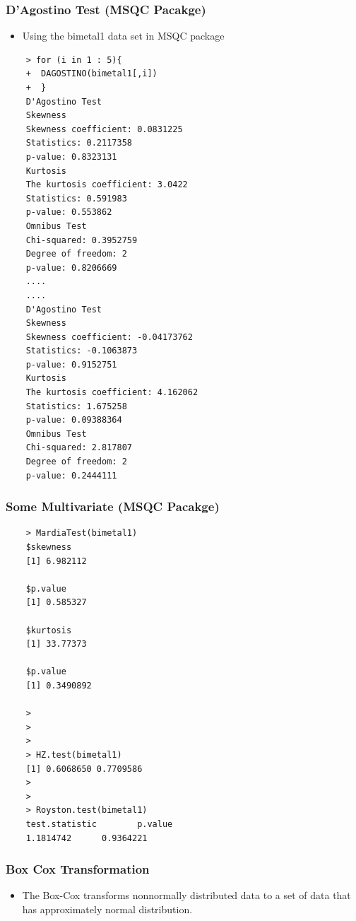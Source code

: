 \documentclass[]{report}
\begin{document}
{\subsubsection{D'Agostino Test (MSQC Pacakge)}
\begin{itemize}
	\item Using the bimetal1 data set in MSQC package
\end{itemize}
\begin{framed}
	\begin{verbatim}
	> for (i in 1 : 5){
	+  DAGOSTINO(bimetal1[,i])
	+  }
	D'Agostino Test
	Skewness
	Skewness coefficient: 0.0831225 
	Statistics: 0.2117358 
	p-value: 0.8323131 
	Kurtosis
	The kurtosis coefficient: 3.0422 
	Statistics: 0.591983 
	p-value: 0.553862 
	Omnibus Test
	Chi-squared: 0.3952759 
	Degree of freedom: 2
	p-value: 0.8206669 
	....
	....
	D'Agostino Test
	Skewness
	Skewness coefficient: -0.04173762 
	Statistics: -0.1063873 
	p-value: 0.9152751 
	Kurtosis
	The kurtosis coefficient: 4.162062 
	Statistics: 1.675258 
	p-value: 0.09388364 
	Omnibus Test
	Chi-squared: 2.817807 
	Degree of freedom: 2
	p-value: 0.2444111 
	\end{verbatim}
\end{framed}
\newpage
\subsubsection{Some Multivariate (MSQC Pacakge)}
\begin{framed}
	\begin{verbatim}
	> MardiaTest(bimetal1)
	$skewness
	[1] 6.982112
	
	$p.value
	[1] 0.585327
	
	$kurtosis
	[1] 33.77373
	
	$p.value
	[1] 0.3490892
	
	> 
	>
	>
	> HZ.test(bimetal1)
	[1] 0.6068650 0.7709586
	> 
	> 
	> Royston.test(bimetal1)
	test.statistic        p.value 
	1.1814742      0.9364221 
	\end{verbatim}
\end{framed}




\subsubsection{Box Cox Transformation}
\begin{itemize}
	\item The Box-Cox transforms nonnormally distributed data to a set of  data that has approximately normal distribution. 
\end{itemize}

}
\end{document}
